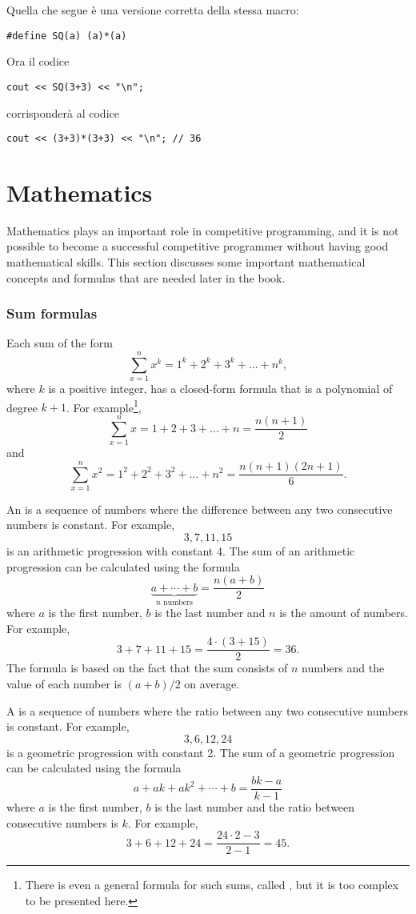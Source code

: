 Quella che segue è una versione corretta della stessa macro:
\begin{lstlisting}
#define SQ(a) (a)*(a)
\end{lstlisting}
Ora il codice
\begin{lstlisting}
cout << SQ(3+3) << "\n";
\end{lstlisting}
corrisponderà al codice
\begin{lstlisting}
cout << (3+3)*(3+3) << "\n"; // 36
\end{lstlisting}


\section{Mathematics}

Mathematics plays an important role in competitive
programming, and it is not possible to become
a successful competitive programmer without
having good mathematical skills.
This section discusses some important
mathematical concepts and formulas that
are needed later in the book.

\subsubsection{Sum formulas}

Each sum of the form
\[\sum_{x=1}^n x^k = 1^k+2^k+3^k+\ldots+n^k,\]
where $k$ is a positive integer,
has a closed-form formula that is a
polynomial of degree $k+1$.
For example\footnote{
There is even a general formula for such sums, called ,
but it is too complex to be presented here.},
\[\sum_{x=1}^n x = 1+2+3+\ldots+n = \frac{n(n+1)}{2}\]
and
\[\sum_{x=1}^n x^2 = 1^2+2^2+3^2+\ldots+n^2 = \frac{n(n+1)(2n+1)}{6}.\]

An  is a 
sequence of numbers
where the difference between any two consecutive
numbers is constant.
For example,
\[3, 7, 11, 15\]
is an arithmetic progression with constant 4.
The sum of an arithmetic progression can be calculated
using the formula
\[\underbrace{a + \cdots + b}_{n \,\, \textrm{numbers}} = \frac{n(a+b)}{2}\]
where $a$ is the first number,
$b$ is the last number and
$n$ is the amount of numbers.
For example,
\[3+7+11+15=\frac{4 \cdot (3+15)}{2} = 36.\]
The formula is based on the fact
that the sum consists of $n$ numbers and
the value of each number is $(a+b)/2$ on average.

A  is a sequence
of numbers
where the ratio between any two consecutive
numbers is constant.
For example,
\[3,6,12,24\]
is a geometric progression with constant 2.
The sum of a geometric progression can be calculated
using the formula
\[a + ak + ak^2 + \cdots + b = \frac{bk-a}{k-1}\]
where $a$ is the first number,
$b$ is the last number and the
ratio between consecutive numbers is $k$.
For example,
\[3+6+12+24=\frac{24 \cdot 2 - 3}{2-1} = 45.\]

